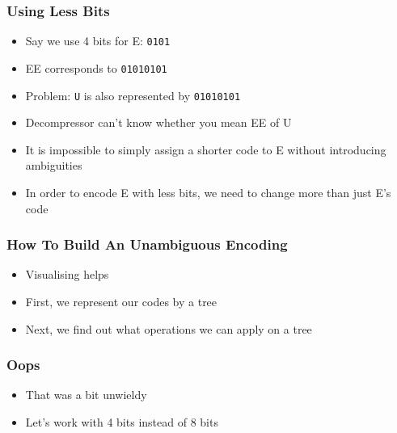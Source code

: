 \documentclass{../ucll-slides}
\begin{document}
\begin{frame}
  \frametitle{Using Less Bits}
  \begin{itemize}
    \item Say we use 4 bits for E: \texttt{0101}
    \item EE corresponds to \texttt{01010101}
    \item Problem: {\tt U} is also represented by \texttt{01010101}
    \item Decompressor can't know whether you mean EE of U
    \item It is impossible to simply assign a shorter code to E without introducing ambiguities
    \item In order to encode E with less bits, we need to change more than just E's code
  \end{itemize}
\end{frame}

\begin{frame}
  \frametitle{How To Build An Unambiguous Encoding}
  \begin{itemize}
    \item Visualising helps
    \item First, we represent our codes by a tree
    \item Next, we find out what operations we can apply on a tree
  \end{itemize}
\end{frame}

% 

\begin{frame}
  \frametitle{Oops}
  \begin{itemize}
    \item That was a bit unwieldy
    \item Let's work with 4 bits instead of 8 bits
  \end{itemize}
\end{frame}
\end{document}
